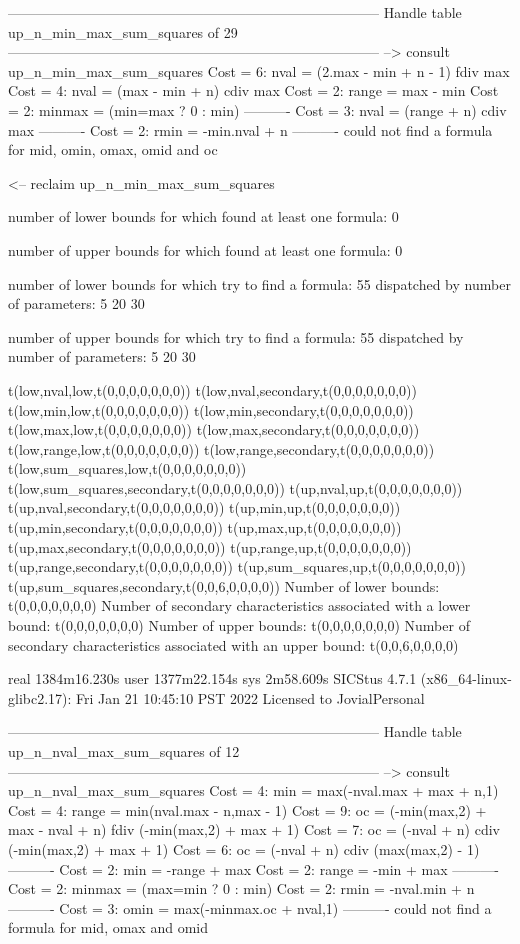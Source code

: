 --------------------------------------------------------------------------------
Handle table up_n_min_max_sum_squares of 29
--------------------------------------------------------------------------------
--> consult up_n_min_max_sum_squares
Cost =  6:  nval   = (2.max - min + n - 1) fdiv max
Cost =  4:  nval   = (max - min + n) cdiv max
Cost =  2:  range  = max - min
Cost =  2:  minmax = (min=max ? 0 : min)
----------
Cost =  3:  nval   = (range + n) cdiv max
----------
Cost =  2:  rmin   = -min.nval + n
----------
could not find a formula for mid, omin, omax, omid and oc

<-- reclaim up_n_min_max_sum_squares

number of lower bounds for which found at least one formula: 0

number of upper bounds for which found at least one formula: 0

number of lower bounds for which try to find a formula: 55
dispatched by number of parameters: 5  20  30

number of upper bounds for which try to find a formula: 55
dispatched by number of parameters: 5  20  30

t(low,nval,low,t(0,0,0,0,0,0,0))
t(low,nval,secondary,t(0,0,0,0,0,0,0))
t(low,min,low,t(0,0,0,0,0,0,0))
t(low,min,secondary,t(0,0,0,0,0,0,0))
t(low,max,low,t(0,0,0,0,0,0,0))
t(low,max,secondary,t(0,0,0,0,0,0,0))
t(low,range,low,t(0,0,0,0,0,0,0))
t(low,range,secondary,t(0,0,0,0,0,0,0))
t(low,sum_squares,low,t(0,0,0,0,0,0,0))
t(low,sum_squares,secondary,t(0,0,0,0,0,0,0))
t(up,nval,up,t(0,0,0,0,0,0,0))
t(up,nval,secondary,t(0,0,0,0,0,0,0))
t(up,min,up,t(0,0,0,0,0,0,0))
t(up,min,secondary,t(0,0,0,0,0,0,0))
t(up,max,up,t(0,0,0,0,0,0,0))
t(up,max,secondary,t(0,0,0,0,0,0,0))
t(up,range,up,t(0,0,0,0,0,0,0))
t(up,range,secondary,t(0,0,0,0,0,0,0))
t(up,sum_squares,up,t(0,0,0,0,0,0,0))
t(up,sum_squares,secondary,t(0,0,6,0,0,0,0))
Number of lower bounds:                                             t(0,0,0,0,0,0,0)
Number of secondary characteristics associated with a lower bound:  t(0,0,0,0,0,0,0)
Number of upper bounds:                                             t(0,0,0,0,0,0,0)
Number of secondary characteristics associated with an upper bound: t(0,0,6,0,0,0,0)

real	1384m16.230s
user	1377m22.154s
sys	2m58.609s
SICStus 4.7.1 (x86_64-linux-glibc2.17): Fri Jan 21 10:45:10 PST 2022
Licensed to JovialPersonal


--------------------------------------------------------------------------------
Handle table up_n_nval_max_sum_squares of 12
--------------------------------------------------------------------------------
--> consult up_n_nval_max_sum_squares
Cost =  4:  min    = max(-nval.max + max + n,1)
Cost =  4:  range  = min(nval.max - n,max - 1)
Cost =  9:  oc     = (-min(max,2) + max - nval + n) fdiv (-min(max,2) + max + 1)
Cost =  7:  oc     = (-nval + n) cdiv (-min(max,2) + max + 1)
Cost =  6:  oc     = (-nval + n) cdiv (max(max,2) - 1)
----------
Cost =  2:  min    = -range + max
Cost =  2:  range  = -min + max
----------
Cost =  2:  minmax = (max=min ? 0 : min)
Cost =  2:  rmin   = -nval.min + n
----------
Cost =  3:  omin   = max(-minmax.oc + nval,1)
----------
could not find a formula for mid, omax and omid


